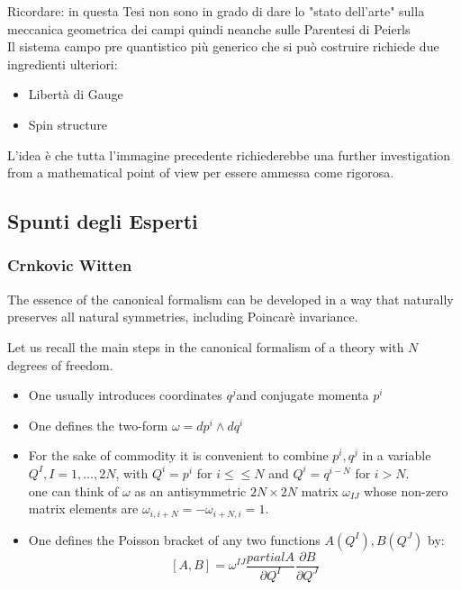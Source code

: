 \documentclass[Main]{subfiles}
\begin{document}
	\begin{Warning}
		Ricordare: in questa Tesi non sono in grado di dare lo "stato dell'arte"  sulla meccanica geometrica dei campi quindi neanche sulle Parentesi di Peierls\\
		Il sistema campo pre quantistico più generico che si può costruire richiede due ingredienti ulteriori:
			\begin{itemize}
				\item Libertà di Gauge
				\item Spin structure
			\end{itemize}		
			L'idea è che tutta l'immagine precedente richiederebbe una further investigation from a mathematical point of view per essere ammessa come rigorosa.
	\end{Warning}
		
		
	\subsection{Spunti degli Esperti}
		\subsubsection{Crnkovic Witten}
			The essence of the canonical formalism can be developed in a way that naturally preserves all natural symmetries, including Poincarè invariance.
			
			Let us recall the main steps in the canonical formalism of a theory with $N$ degrees of freedom.
			\begin{itemize}
				\item  One usually introduces coordinates $q^j$and conjugate momenta $p^i$
				\item One defines the two-form $\omega = dp^i \wedge dq^i$
				\item For the sake of commodity it is convenient to combine $p^i, q^j$ in a variable $Q^I , I = 1,\ldots,2N$, with $Q^i=p^i$ for $i\leq\leq N$ and $Q^i= q^{i-N}$ for $i>N$.\\
					one can think of $\omega$ as an antisymmetric $2N \times 2N$ matrix $\omega_{I J}$ whose non-zero matrix elements are $\omega_{i, i+N} = - \omega_{i+N,i}= 1$.
				\item One defines the Poisson bracket of any two functions $A(Q^I) , B(Q^J)$ by:
					\begin{displaymath}
						\left[ A , B \right] = \omega^{I J} \frac{partial A}{\partial Q^I} \frac{\partial B}{\partial Q^J}
					\end{displaymath}
			\end{itemize}
	
\end{document}
